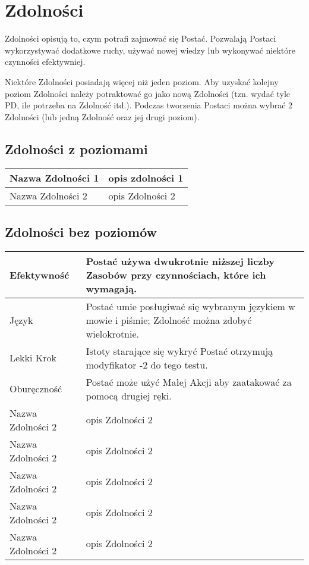 \documentclass[10pt,a4paper]{book}
\begin{document}
\section{Zdolności}
\begin{multicols}{2}

Zdolności opisują to, czym potrafi zajmować się Postać. Pozwalają Postaci wykorzystywać dodatkowe ruchy, używać nowej wiedzy lub wykonywać niektóre czynności efektywniej.

Niektóre Zdolności posiadają więcej niż jeden poziom. Aby uzyskać kolejny poziom Zdolności należy potraktować go jako nową Zdolności (tzn. wydać tyle PD, ile potrzeba na Zdolność itd.). Podczas tworzenia Postaci można wybrać 2 Zdolności (lub jedną Zdolność oraz jej drugi poziom).


\end{multicols}


\subsection*{Zdolności z poziomami}

\begin{center}
\begin{tabular}{ | m{50mm} | m{100mm} | }
	\hline
		Nazwa Zdolności 1 & opis zdolności 1 \\
	\hline
		Nazwa Zdolności 2 & opis Zdolności 2 \\
	\hline
\end{tabular}
\end{center}


\subsection*{Zdolności bez poziomów}

\begin{center}
\begin{tabular}{ | m{50mm} | m{100mm} | }
	\hline
		Efektywność & Postać używa dwukrotnie niższej liczby Zasobów przy czynnościach, które ich wymagają. \\
	\hline
		Język & Postać umie posługiwać się wybranym językiem w mowie i piśmie; Zdolność można zdobyć wielokrotnie. \\
	\hline
		Lekki Krok & Istoty starające się wykryć Postać otrzymują modyfikator -2 do tego testu. \\
	\hline
		Oburęczność & Postać może użyć Małej Akcji aby zaatakować za pomocą drugiej ręki. \\
	\hline
		Nazwa Zdolności 2 & opis Zdolności 2 \\
	\hline
		Nazwa Zdolności 2 & opis Zdolności 2 \\
	\hline
		Nazwa Zdolności 2 & opis Zdolności 2 \\
	\hline
		Nazwa Zdolności 2 & opis Zdolności 2 \\
	\hline
		Nazwa Zdolności 2 & opis Zdolności 2 \\
	\hline
\end{tabular}
\end{center}
\end{document}
